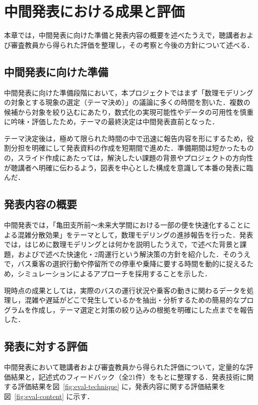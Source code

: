 \chapter{中間発表における成果と評価}
本章では，中間発表に向けた準備と発表内容の概要を述べたうえで，聴講者および審査教員から得られた評価を整理し，その考察と今後の方針について述べる．

\section{中間発表に向けた準備}
中間発表に向けた準備段階において，本プロジェクトではまず「数理モデリングの対象とする現象の選定（テーマ決め）」の議論に多くの時間を割いた．複数の候補から対象を絞り込むにあたり，数式化の実現可能性やデータの可用性を慎重に吟味・評価したため，テーマの最終決定は中間発表直前となった．

テーマ決定後は，極めて限られた時間の中で迅速に報告内容を形にするため，役割分担を明確にして発表資料の作成を短期間で進めた．準備期間は短かったものの，スライド作成にあたっては，解決したい課題の背景やプロジェクトの方向性が聴講者へ明確に伝わるよう，図表を中心とした構成を意識して本番の発表に臨んだ．

\section{発表内容の概要}
中間発表では，「亀田支所前～未来大学間における一部の便を快速化することによる混雑分散効果」をテーマとして，数理モデリングの進捗報告を行った．発表では，はじめに数理モデリングとは何かを説明したうえで，で述べた背景と課題，およびで述べた快速化・2周運行という解決策の方針を紹介した．そのうえで，バス乗客の選択行動や停留所での停車や乗降に要する時間を動的に捉えるため，シミュレーションによるアプローチを採用することを示した．

現時点の成果としては，実際のバスの運行状況や乗客の動きに関わるデータを処理し，混雑や遅延がどこで発生しているかを抽出・分析するための簡易的なプログラムを作成し，テーマ選定と対策の絞り込みの根拠を明確にした点までを報告した．

\section{発表に対する評価}
中間発表において聴講者および審査教員から得られた評価について，定量的な評価結果と，記述式のフィードバック（全21件）をもとに整理する．発表技術に関する評価結果を図~\ref{fig:eval-technique} に，発表内容に関する評価結果を図~\ref{fig:eval-content} に示す．

